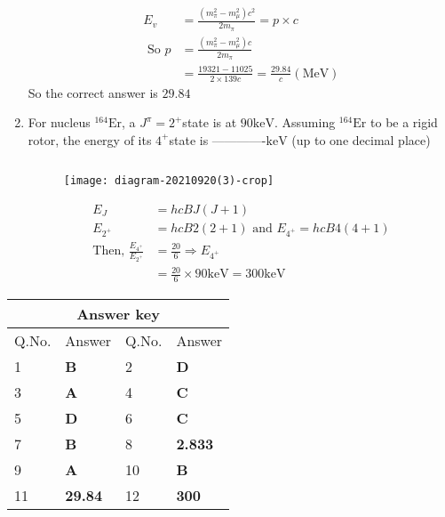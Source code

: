 \begin{enumerate}
{}
\begin{answer}
\begin{align*}
E_{v}&=\frac{\left(m_{\pi}^{2}-m_{\mu}^{2}\right) c^{2}}{2 m_{\pi}}=p \times c\\
\text{	So }p&=\frac{\left(m_{\pi}^{2}-m_{\mu}^{2}\right) c}{2 m_{\pi}}\\&=\frac{19321-11025}{2 \times 139 c}=\frac{29.84}{c}(\mathrm{MeV})
\end{align*}
So the correct answer is $29.84$
\end{answer}
\item For nucleus ${ }^{164} \mathrm{Er}$, a $J^{\pi}=2^{+}$state is at $90 \mathrm{keV}$. Assuming ${ }^{164} \mathrm{Er}$ to be a rigid rotor, the energy of its $4^{+}$state is -------------$\mathrm{keV}$ (up to one decimal place)
{}
\begin{answer}$\left. \right. $
\begin{figure}[H]
	\centering
	\texttt{[image: diagram-20210920(3)-crop]}
\end{figure}
\begin{align*}
E_{J}&=h c B J(J+1)\\
E_{2^{+}}&=h c B 2(2+1)\text{ and }E_{4^{+}}=h c B 4(4+1)\\
\text{Then, }\frac{E_{4^{+}}}{E_{2^{+}}}&=\frac{20}{6} \Rightarrow E_{4^{+}}\\&=\frac{20}{6} \times 90 \mathrm{keV}=300 \mathrm{keV}
\end{align*}
\end{answer}
\end{enumerate}
\setlength\arrayrulewidth{1pt}
\begin{table}[H]
	\centering
	\begin{tabular}{|p{1.5cm}|p{1.5cm}||p{1.5cm}|p{1.5cm}|}
		\hline
		\multicolumn{4}{|c|}{\textbf{Answer key}}\\\hline\hline
		\rowcolor{ocrel}Q.No.&Answer&Q.No.&Answer\\\hline
		1&\textbf{B} &2&\textbf{D}\\\hline 
		3&\textbf{A} &4&\textbf{C} \\\hline
		5&\textbf{D} &6&\textbf{C} \\\hline
		7&\textbf{B}&8&\textbf{2.833}\\\hline
		9&\textbf{A}&10&\textbf{B}\\\hline
		11&\textbf{29.84} &12&\textbf{300}\\\hline
		
	\end{tabular}
\end{table}


